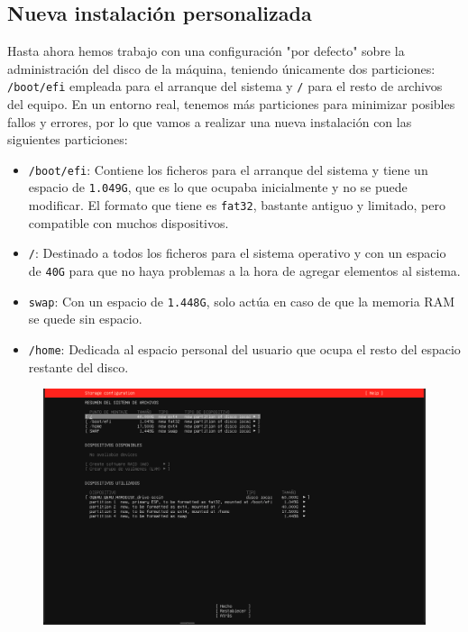 \documentclass[10pt]{article}
\begin{document}
	\subsection{Nueva instalación personalizada}
	Hasta ahora hemos trabajo con una configuración "por defecto" sobre la administración del disco de la máquina, teniendo únicamente dos particiones: \verb|/boot/efi| empleada para el arranque del sistema y \verb|/| para el resto de archivos del equipo. En un entorno real, tenemos más particiones para minimizar posibles fallos y errores, por lo que vamos a realizar una nueva instalación con las siguientes particiones:
	\begin{itemize}
		\item \verb|/boot/efi|: Contiene los ficheros para el arranque del sistema y tiene un espacio de \verb|1.049G|, que es lo que ocupaba inicialmente y no se puede modificar. El formato que tiene es \verb|fat32|, bastante antiguo y limitado, pero compatible con muchos dispositivos.
		\item \verb|/|: Destinado a todos los ficheros para el sistema operativo y con un espacio de \verb|40G| para que no haya problemas a la hora de agregar elementos al sistema.
		\item \verb|swap|: Con un espacio de \verb|1.448G|, solo actúa en caso de que la memoria RAM se quede sin espacio.
		\item \verb|/home|: Dedicada al espacio personal del usuario que ocupa el resto del espacio restante del disco.
	\end{itemize}
	\begin{figure}[H]
		\setlength{\abovecaptionskip}{0cm}
		\setlength{\belowcaptionskip}{0cm}
		\centering
		\includegraphics[width=0.6\linewidth]{Recursos/nuevaInstalacion.png}
	\end{figure}
	
\end{document}
